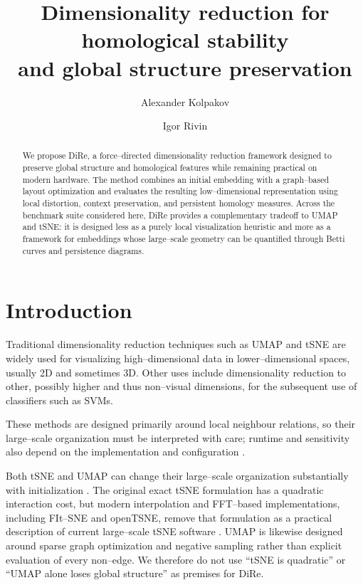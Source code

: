 \documentclass[11pt]{article}
\title{Dimensionality reduction for homological stability \\ and global structure preservation}
\author[1]{Alexander Kolpakov}
\author[2]{Igor Rivin}  %
\affil[1]{University of Austin, Austin TX, USA;
\texttt{akolpakov@uaustin.org}}
\affil[2]{Temple University, Philadelphia PA, USA;  
\texttt{rivin@temple.edu}}
\date{}  %
\begin{document}
\maketitle

\begin{abstract}
We propose DiRe, a force--directed dimensionality reduction framework designed to preserve global structure and homological features while remaining practical on modern hardware. The method combines an initial embedding with a graph--based layout optimization and evaluates the resulting low--dimensional representation using local distortion, context preservation, and persistent homology measures. Across the benchmark suite considered here, DiRe provides a complementary tradeoff to UMAP and tSNE: it is designed less as a purely local visualization heuristic and more as a framework for embeddings whose large--scale geometry can be quantified through Betti curves and persistence diagrams.
\end{abstract}

\section{Introduction}
Traditional dimensionality reduction techniques such as UMAP and tSNE \cite{umap,vandermaaten-tsne} are widely used for visualizing high--dimensional data in lower--dimensional spaces, usually 2D and sometimes 3D. Other uses include dimensionality reduction to other, possibly higher and thus non--visual dimensions, for the subsequent use of classifiers such as SVMs.

These methods are designed primarily around local neighbour relations, so
their large--scale organization must be interpreted with care; runtime and
sensitivity also depend on the implementation and configuration
\cite{kobak2019art,pachter}.

Both tSNE and UMAP can change their large--scale organization substantially with initialization \cite{kobak-linderman-initialization}. The original exact tSNE formulation has a quadratic interaction cost, but modern interpolation and FFT--based implementations, including FIt--SNE and openTSNE, remove that formulation as a practical description of current large--scale tSNE software \cite{linderman-fitsne,opentsne}. UMAP is likewise designed around sparse graph optimization and negative sampling rather than explicit evaluation of every non--edge. We therefore do not use ``tSNE is quadratic'' or ``UMAP alone loses global structure'' as premises for DiRe.
\end{document}
